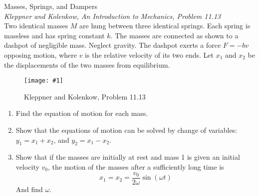 \documentclass[11pt]{article}
\newcommand{\fig}[4]{
    \begin{figure}[H]
        \centering
        \texttt{[image: \#1]}
        \caption{#2}
        \label{exp4fit}
    \end{figure}
}
\theoremstyle{gangnamstyle}{\newtheorem{definition}{Definition}[]}
\theoremstyle{gangnamstyle}{\newtheorem{example}{Example}[]}
\theoremstyle{gangnamstyle}{\newtheorem{problem}{Problem}[]}
\theoremstyle{gangnamstyle}{\newtheorem{warning}{Warning}[]}
\begin{document}
\begin{problem}
Masses, Springs, and Dampers \\
\textit{Kleppner and Kolenkow, An Introduction to Mechanics, Problem 11.13} \\
Two identical masses $M$ are hung between three identical springs. Each spring is massless and has spring constant $k$. The masses are connected as shown to a dashpot of negligible mass. Neglect gravity. The dashpot exerts a force $F = -bv$ opposing motion, where $v$ is the relative velocity of its two ends. Let $x_1$ and $x_2$ be the displacements of the two masses from equilibrium.
\fig{figs/n3/dampers.jpg}{Kleppner and Kolenkow, Problem 11.13}{0.5}{0}
\begin{enumerate}
\item Find the equation of motion for each mass.
\item Show that the equations of motion can be solved by change of variables: $y_1 = x_1 + x_2$, and $y_2 = x_1 - x_2$. 
\item Show that if the masses are initially at rest and mass 1 is given an initial velocity $v_0$, the motion of the masses after a sufficiently long time is
\[ x_1 = x_2 = \frac{v_0}{2\omega}\sin(\omega t) \]
And find $\omega$. 
\end{enumerate}
\end{problem}
\end{document}
